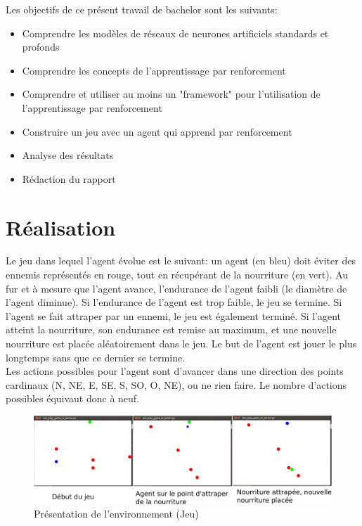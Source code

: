 \documentclass[11pt,a4paper]{report}
\begin{document}
  \par Les objectifs de ce présent travail de bachelor sont les suivants: 
  
  \renewcommand{\labelitemi}{\textbullet}
  \begin{itemize}
  \item Comprendre les modèles de réseaux de neurones artificiels standards et profonds
  \item Comprendre les concepts de l'apprentissage par renforcement
  \item Comprendre et utiliser au moins un "framework" pour l’utilisation de l'apprentissage par renforcement
  \item Construire un jeu avec un agent qui apprend par renforcement
  \item Analyse des résultats 
  \item Rédaction du rapport
  \end{itemize}
  
  \section{Réalisation}
  
  \par Le jeu dans lequel l'agent évolue est le suivant: un agent (en bleu) doit éviter des ennemis représentés en rouge, tout en récupérant de la nourriture (en vert). Au fur et à mesure que l'agent avance, l'endurance de l'agent faibli (le diamètre de l'agent diminue). Si l'endurance de l'agent est trop faible, le jeu se termine. Si l'agent se fait attraper par un ennemi, le jeu est également terminé. Si l'agent atteint la nourriture, son endurance est remise au maximum, et une nouvelle nourriture est placée aléatoirement dans le jeu. Le but de l'agent est jouer le plus longtemps sans que ce dernier se termine.\\
  Les actions possibles pour l'agent sont d'avancer dans une direction des points cardinaux (N, NE, E, SE, S, SO, O, NE), ou ne rien faire. Le nombre d'actions possibles équivaut donc à neuf. 
  
   \begin{figure}[!h]
   \center
   \includegraphics[scale=0.2]{ressources/presentation_jeu.png}
   \caption{Présentation de l'environnement (Jeu)}
   \end{figure} 
  
\end{document}
